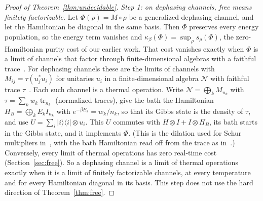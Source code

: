 \documentclass[11pt]{article}
\theoremstyle{definition}
\theoremstyle{remark}
\newcommand{\Trt}{\kappa_\beta}
\providecommand{\tr}{\operatorname{tr}}
\begin{document}
\begin{proof}[Proof of Theorem~\ref{thm:undecidable}]
\emph{Step 1: on dephasing channels, free means finitely factorizable.} Let $\Phi(\rho)=M\circ\rho$ be a generalized dephasing channel, and let the Hamiltonian be diagonal in the same basis. Then $\Phi$ preserves every energy population, so the energy term vanishes and $\Trt(\Phi)=\sup_\rho s_\rho(\Phi)$, the zero-Hamiltonian purity cost of our earlier work. That cost vanishes exactly when $\Phi$ is a limit of channels that factor through finite-dimensional algebras with a faithful trace~\cite{Memory,ClosedMemory}. For dephasing channels these are the limits of channels with $M_{ij}=\tau(u_j^*u_i)$ for unitaries $u_i$ in a finite-dimensional algebra $\mathcal N$ with faithful trace $\tau$~\cite{HaagerupMusat11,Musat25}. Each such channel is a thermal operation. Write $\mathcal N=\bigoplus_k M_{n_k}$ with $\tau=\sum_kw_k\tr_{n_k}$ (normalized traces), give the bath the Hamiltonian $H_B=\bigoplus_kE_kI_{n_k}$ with $e^{-\beta E_k}=w_k/n_k$, so that its Gibbs state is the density of $\tau$, and use $U=\sum_i|i\rangle\langle i|\otimes u_i$. This $U$ commutes with $H\otimes I+I\otimes H_B$, its bath starts in the Gibbs state, and it implements $\Phi$. (This is the dilation used for Schur multipliers in~\cite{HaagerupMusat11,LieEtAl26}, with the bath Hamiltonian read off from the trace as in~\cite{LieEtAl26}.) Conversely, every limit of thermal operations has zero real-time cost (Section~\ref{sec:free}). So a dephasing channel is a limit of thermal operations exactly when it is a limit of finitely factorizable channels, at every temperature and for every Hamiltonian diagonal in its basis. This step does not use the hard direction of Theorem~\ref{thm:free}.


\end{proof}
\end{document}
